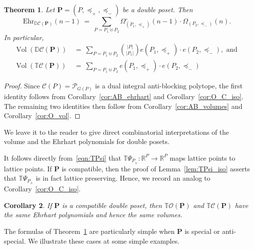 \documentclass[11pt]{amsart}
\newtheorem{thm}{Theorem}[section]
\newtheorem{cor}[thm]{Corollary}
\theoremstyle{definition}
\begin{document}
\begin{thm}\label{thm:TC_ehr}
    Let ${\mathbf{P}} = ({P},\preceq_+,\preceq_-)$ be a double poset. Then
    \[
    {\mathrm{Ehr}}_{{\mathbb{D}{\mathcal{C}({{{\mathbf{P}}}})}}}(n-1) \ = \ \sum_{{P} = {P}_1 \uplus {P}_2}
        \Omega^\circ_{({P}_1,\preceq_+)}(n-1) \cdot
        \Omega_{({P}_2,\preceq_-)}(n).
    \]
    In particular,
    \begin{align*}
        \operatorname{Vol}({\mathbb{D}{\mathcal{C}({{{\mathbf{P}}}})}}) \ &= \ 
        \sum_{{P} = {P}_1 \uplus {P}_2} \binom{|{P}|}{|{P}_1|} 
        e({P}_1,\preceq_+)\cdot
        e({P}_2,\preceq_-), \text{ and }\\
        \operatorname{Vol}({{\mathbb{T}}{\mathcal{C}({{{\mathbf{P}}}})}}) \ &= \ 
        \sum_{{P} = {P}_1 \uplus {P}_2} 
        e({P}_1,\preceq_+) \cdot
        e({P}_2,\preceq_-)
    \end{align*}
\end{thm}
\begin{proof}
    Since ${\mathcal{C}({P})} = {\mathcal{P}}_{G({P})}$ is a dual integral anti-blocking
    polytope, the first identity follows from Corollary~\ref{cor:AB_ehrhart}
    and Corollary~\ref{cor:O_C_iso}. The remaining two identities then follow
    from Corollary~\ref{cor:AB_volumes} and Corollary~\ref{cor:O_vol}.
\end{proof}

We leave it to the reader to give direct combinatorial interpretations of the
volume and the Ehrhart polynomials for double posets. 

It follows directly from~\eqref{eqn:TPsi} that ${{\mathbb{T}}{\Psi}_{{{P}_{\pm}}}} : {\mathbb{R}}^{P}
\rightarrow {\mathbb{R}}^{P}$ maps lattice points to lattice points. If ${\mathbf{P}}$ is
compatible, then the proof of Lemma~\ref{lem:TPsi_iso} asserts that
${{\mathbb{T}}{\Psi}_{{{P}_{\pm}}}}$ is in fact lattice preserving. Hence, we record an analog
to Corollary~\ref{cor:O_C_iso}.

\begin{cor}\label{cor:TO_TC_iso}
    If ${\mathbf{P}}$ is a compatible double poset, then ${{\mathbb{T}}{\mathcal{O}({\mathbf{P}})}}$ and
    ${{\mathbb{T}}{\mathcal{C}({{{\mathbf{P}}}})}}$ have the same Ehrhart polynomials and hence the same
    volumes.
\end{cor}

The formulas of Theorem~\ref{thm:TC_ehr} are particularly simple when ${\mathbf{P}}$
is special or anti-special. We illustrate these cases at some simple examples.
\end{document}
